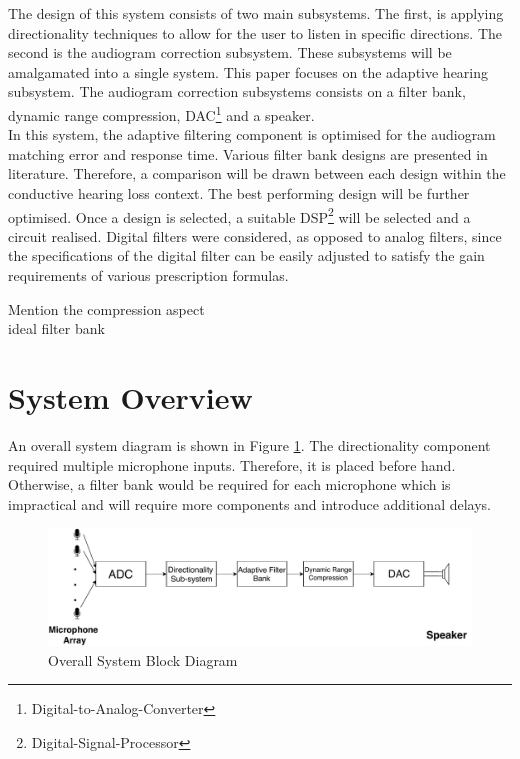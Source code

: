 \documentclass[11pt,onecolumn]{witseiepaper}
\begin{document}
\noindent The design of this system consists of two main subsystems. The first, is applying directionality techniques to allow for the user to listen in specific directions. The second is the audiogram correction subsystem. These subsystems will be amalgamated into a single system. This paper focuses on the adaptive hearing subsystem. The audiogram correction subsystems consists on a filter bank, dynamic range compression, DAC\footnote{Digital-to-Analog-Converter} and a speaker. \\
\newline
\noindent In this system, the adaptive filtering component is optimised for the audiogram matching error and response time. Various filter bank designs are presented in literature. Therefore, a comparison will be drawn between each design within the conductive hearing loss context. The best performing design will be further optimised. Once a design is selected, a suitable DSP\footnote{Digital-Signal-Processor} will be selected and a circuit realised. Digital filters were considered, as opposed to analog filters, since the specifications of the digital filter can be easily adjusted to satisfy the gain requirements of various prescription formulas.


Mention the compression aspect\\

ideal filter bank

\section{System Overview}

\noindent An overall system diagram is shown in Figure \ref{fig:system}. The directionality component required multiple microphone inputs. Therefore, it is placed before hand. Otherwise, a filter bank would be required for each microphone which is impractical and will require more components and introduce additional delays.

\begin{figure}[h]
\centering
\includegraphics[width=0.9\linewidth]{system.pdf}
\caption{Overall System Block Diagram}
\label{fig:system}
\end{figure}  
\end{document}
